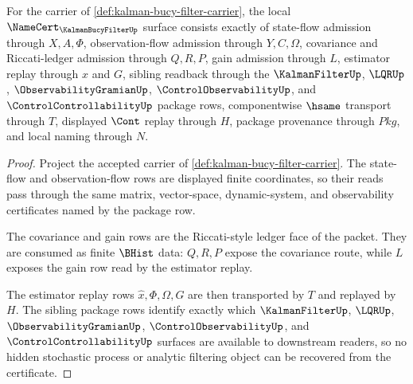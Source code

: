 \begin{theorem}
\label{thm:kalman-bucy-filter-namecert-obligations}
For the carrier of \autoref{def:kalman-bucy-filter-carrier}, the local $\NameCert_{\KalmanBucyFilterUp}$ surface consists exactly of state-flow admission through $X,A,\Phi$, observation-flow admission through $Y,C,\Omega$, covariance and Riccati-ledger admission through $Q,R,P$, gain admission through $L$, estimator replay through $\widehat{x}$ and $G$, sibling readback through the $\KalmanFilterUp$, $\LQRUp$, $\ObservabilityGramianUp$, $\ControlObservabilityUp$, and $\ControlControllabilityUp$ package rows, componentwise $\hsame$ transport through $T$, displayed $\Cont$ replay through $H$, package provenance through $Pkg$, and local naming through $N$.
\end{theorem}
\begin{proof}
Project the accepted carrier of \autoref{def:kalman-bucy-filter-carrier}. The state-flow and observation-flow rows are displayed finite coordinates, so their reads pass through the same matrix, vector-space, dynamic-system, and observability certificates named by the package row.

The covariance and gain rows are the Riccati-style ledger face of the packet. They are consumed as finite $\BHist$ data: $Q,R,P$ expose the covariance route, while $L$ exposes the gain row read by the estimator replay.

The estimator replay rows $\widehat{x},\Phi,\Omega,G$ are then transported by $T$ and replayed by $H$. The sibling package rows identify exactly which $\KalmanFilterUp$, $\LQRUp$, $\ObservabilityGramianUp$, $\ControlObservabilityUp$, and $\ControlControllabilityUp$ surfaces are available to downstream readers, so no hidden stochastic process or analytic filtering object can be recovered from the certificate.
\end{proof}




